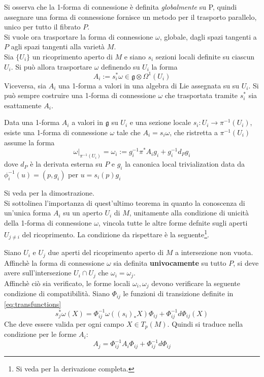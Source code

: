 Si osserva che la 1-forma di connessione è definita \emph{globalmente} su P, quindi
assegnare una forma di connessione fornisce un metodo per il trasporto parallelo,
unico per tutto il fibrato $P$.\\

Si vuole ora trasportare la forma di connessione $\omega$, globale, dagli spazi
tangenti a $P$ agli spazi tangenti alla varietà $M$.\\

Sia $\{U_i\}$ un ricoprimento aperto di $M$ e siano $s_i$ sezioni locali definite
su ciascun $U_i$. Si può allora trasportare $\omega$ definendo su $U_i$ la forma
$$
   A_i := s_i^* \omega \in \mathfrak{g} \otimes \Omega^1(U_i)
$$
Viceversa, sia $A_i$ una 1-forma a valori in una algebra di Lie assegnata su su $U_i$.
Si può sempre costruire una 1-forma di connessione $\omega$ che trasportata tramite
$s_i^*$ sia esattamente $A_i$.
\begin{theorem}\label{thm:gaugepotential}
   Data una 1-forma $A_i$ a valori in $\mathfrak{g}$ su $U_i$ e una sezione locale
   $s_i : U_i \to \pi^{-1}(U_i)$, esiste una 1-forma di connessione $\omega$
   tale che $A_i = s_i \omega$, che ristretta a $\pi^{-1}(U_i)$ assume la forma
   $$
      \omega|_{\pi^{-1}(U_i)} = \omega_i := g_i^{-1} \pi^* A_i g_i + g_i^{-1} d_P g_i
   $$
   dove $d_P$ è la derivata esterna su $P$ e $g_i$ la canonica local trivialization
   data da $\phi_i^{-1}(u) = (p,g_i)$ per $u = s_i(p)g_i$
\end{theorem}
Si veda \cite{nakahara} per la dimostrazione.\\

Si sottolinea l'importanza di quest'ultimo teorema in quanto la conoscenza di un'unica
forma $A_i$ su un aperto $U_i$ di $M$, unitamente alla condizione di unicità della
1-forma di connessione $\omega$, vincola tutte le altre forme defnite sugli aperti
$U_{j\neq i}$ del ricoprimento. La condizione da rispettare è la seguente\footnote{
Si veda \cite{nakahara} per la derivazione completa.
}.

Siano $U_i$ e $U_j$ due aperti del ricoprimento aperto di $M$ a intersezione non vuota.
Affinchè la forma di connessione $\omega$ sia definita \textbf{univocamente} su tutto $P$,
si deve avere sull'intersezione $U_i \cap U_j$ che $\omega_i = \omega_j$.\\
Affinchè ciò sia verificato, le forme locali $\omega_i,\omega_j$ devono verificare
la seguente condizione di compatibilità. Siano $\Phi_{ij}$ le funzioni di transizione
definite in \ref{eq:transfunctions}
$$
   s^*_j \omega (X) = \Phi_{ij}^{-1} \omega( (s_i)_*X ) \Phi_{ij}
                         + \Phi_{ij}^{-1}d\Phi_{ij}(X)
$$
Che deve essere valida per ogni campo $X \in T_p(M)$. Quindi si traduce nella
condizione per le forme $A_i$:
\begin{equation}\label{eq:condcompatibility}
   A_j = \Phi_{ij}^{-1} A_i \Phi_{ij} + \Phi_{ij}^{-1}d\Phi_{ij}
\end{equation}

